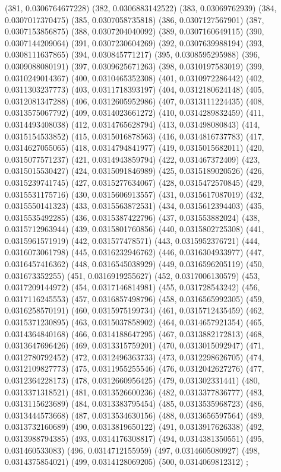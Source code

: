 {					(381, 0.0306764677228)
					(382, 0.0306883142522)
					(383, 0.03069762939)
					(384, 0.0307017370475)
					(385, 0.0307058735818)
					(386, 0.0307127567901)
					(387, 0.0307153856875)
					(388, 0.0307204040092)
					(389, 0.0307160649115)
					(390, 0.0307144209064)
					(391, 0.0307230604269)
					(392, 0.0307639988194)
					(393, 0.0308111637865)
					(394, 0.030845771217)
					(395, 0.0308595295988)
					(396, 0.0309088080191)
					(397, 0.0309625671263)
					(398, 0.0310197583019)
					(399, 0.0310249014367)
					(400, 0.0310465352308)
					(401, 0.0310972286442)
					(402, 0.0311303237773)
					(403, 0.0311718393197)
					(404, 0.0312180624148)
					(405, 0.0312081347288)
					(406, 0.0312605952986)
					(407, 0.0313111224435)
					(408, 0.0313575067792)
					(409, 0.0314023661272)
					(410, 0.0314289832459)
					(411, 0.0314493408038)
					(412, 0.0314765628794)
					(413, 0.031498080843)
					(414, 0.0315154533852)
					(415, 0.0315016878563)
					(416, 0.0314816737783)
					(417, 0.0314627055065)
					(418, 0.0314794841977)
					(419, 0.0315015682011)
					(420, 0.0315077571237)
					(421, 0.0314943859794)
					(422, 0.031467372409)
					(423, 0.0315015530427)
					(424, 0.0315091846989)
					(425, 0.0315189020526)
					(426, 0.0315239741745)
					(427, 0.0315277634067)
					(428, 0.0315472570845)
					(429, 0.0315531175716)
					(430, 0.0315606913557)
					(431, 0.0315617087019)
					(432, 0.0315550141323)
					(433, 0.0315563872531)
					(434, 0.0315612394403)
					(435, 0.0315535492285)
					(436, 0.0315387422796)
					(437, 0.031553882024)
					(438, 0.0315712963944)
					(439, 0.0315801760856)
					(440, 0.0315802725308)
					(441, 0.0315961571919)
					(442, 0.031577478571)
					(443, 0.0315952376721)
					(444, 0.0316073061798)
					(445, 0.0316232946762)
					(446, 0.0316304933977)
					(447, 0.0316457416362)
					(448, 0.0316545038929)
					(449, 0.0316596205119)
					(450, 0.031673352255)
					(451, 0.0316919255627)
					(452, 0.0317006130579)
					(453, 0.0317209144972)
					(454, 0.0317146814981)
					(455, 0.031728543242)
					(456, 0.0317116245553)
					(457, 0.0316857498796)
					(458, 0.0316565992305)
					(459, 0.0316258570191)
					(460, 0.0315975199734)
					(461, 0.0315712435459)
					(462, 0.0315371230895)
					(463, 0.0315037858902)
					(464, 0.0314657921354)
					(465, 0.0314364840168)
					(466, 0.0314188647295)
					(467, 0.0313882172813)
					(468, 0.0313647696426)
					(469, 0.0313315759201)
					(470, 0.0313015092947)
					(471, 0.0312780792452)
					(472, 0.0312496363733)
					(473, 0.0312298626705)
					(474, 0.0312109827773)
					(475, 0.0311955255546)
					(476, 0.0312042627276)
					(477, 0.0312364228173)
					(478, 0.0312660956425)
					(479, 0.031302331441)
					(480, 0.0313371318521)
					(481, 0.0313526600236)
					(482, 0.0313377836777)
					(483, 0.0313115623689)
					(484, 0.0313383795454)
					(485, 0.0313535968723)
					(486, 0.0313444573668)
					(487, 0.0313534630156)
					(488, 0.0313656597564)
					(489, 0.0313732160689)
					(490, 0.0313819650122)
					(491, 0.0313917626338)
					(492, 0.0313988794385)
					(493, 0.0314176308817)
					(494, 0.0314381350551)
					(495, 0.031460533083)
					(496, 0.0314712155959)
					(497, 0.0314605080927)
					(498, 0.0314375854021)
					(499, 0.0314128069205)
					(500, 0.0314069812312)
				};
